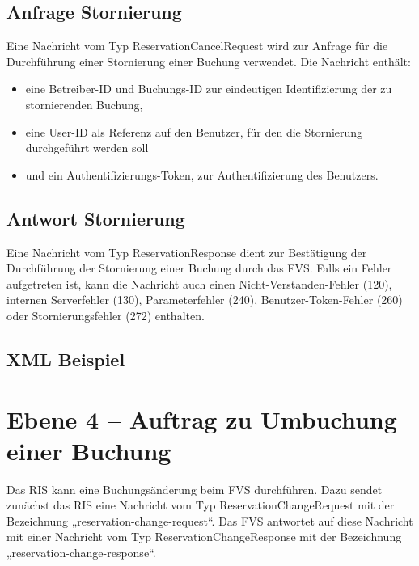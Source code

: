

\subsection{Anfrage Stornierung}
Eine Nachricht vom Typ ReservationCancelRequest wird zur Anfrage für die Durchführung einer Stornierung einer Buchung verwendet. Die Nachricht enthält:
\begin{itemize}
\item eine Betreiber-ID und Buchungs-ID zur eindeutigen Identifizierung der zu stornierenden Buchung,
\item eine User-ID als Referenz auf den Benutzer, für den die Stornierung durchgeführt werden soll
\item und ein Authentifizierungs-Token, zur Authentifizierung des Benutzers.
\end{itemize}



\subsection{Antwort Stornierung}
Eine Nachricht vom Typ ReservationResponse dient zur Bestätigung der Durchführung der Stornierung einer Buchung durch das FVS. Falls ein Fehler aufgetreten ist, kann die Nachricht auch einen Nicht-Verstanden-Fehler (120), internen Serverfehler (130), Parameterfehler (240), Benutzer-Token-Fehler (260) oder Stornierungsfehler (272) enthalten.



\subsection{XML Beispiel}

\section{Ebene 4 -- Auftrag zu Umbuchung einer Buchung}
Das RIS kann eine Buchungsänderung beim FVS durchführen. Dazu sendet zunächst das RIS eine Nachricht vom Typ ReservationChangeRequest mit der Bezeichnung „reservation-change-request“. Das FVS antwortet auf diese Nachricht mit einer Nachricht vom Typ ReservationChangeResponse mit der Bezeichnung „reservation-change-response“.



